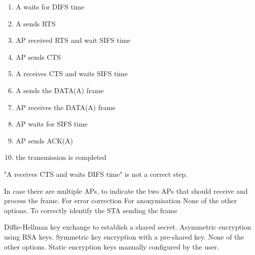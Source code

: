\begin{solution}
    \begin{enumerate}
        \item A waits for DIFS time
        \item A sends RTS
        \item AP received RTS and wait SIFS time
        \item AP sends CTS
        \item A receives CTS and waits SIFS time
        \item A sends the DATA(A) frame
        \item AP receives the DATA(A) frame
        \item AP waits for SIFS time
        \item AP sends ACK(A)
        \item the transmission is completed
    \end{enumerate}
    "A receives CTS and waits DIFS time" is not a correct step.
\end{solution}

\begin{checkboxes}
    \choice In case there are multiple APs, to indicate the two APs that should receive and process the frame.
    \choice For error correction
    \choice For anonymisation
    \CorrectChoice None of the other options.
    \choice To correctly identify the STA sending the frame
\end{checkboxes}

\begin{checkboxes}
    \CorrectChoice Diffie-Hellman key exchange to establish a shared secret.
    \choice Asymmetric encryption using RSA keys.
    \choice Symmetric key encryption with a pre-shared key.
    \choice None of the other options.
    \choice Static encryption keys manually configured by the user.
\end{checkboxes}

